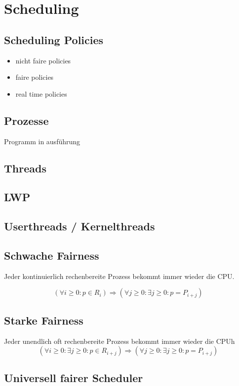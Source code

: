 \section{Scheduling}

\subsection{Scheduling Policies}

\begin{itemize}
\item nicht faire policies
\item faire policies
\item real time policies
\end{itemize}

\subsection{Prozesse}
Programm in ausführung

\subsection{Threads}

\subsection{LWP}

\subsection{Userthreads / Kernelthreads}

\subsection{Schwache Fairness}
Jeder kontinuierlich rechenbereite Prozess bekommt immer wieder die CPU.

$$(\forall i \geq 0 : p \in  R_{i}) \Rightarrow (\forall j \geq 0 : \exists j \geq 0 : p = P_{i+j})$$

\subsection{Starke Fairness}

Jeder unendlich oft rechenbereite Prozess bekommt immer wieder die CPUh
$$(\forall i \geq 0 : \exists j \geq 0 : p \in  R_{i + j}) \Rightarrow (\forall j \geq 0 : \exists j \geq 0 : p = P_{i+j})$$


\subsection{Universell fairer Scheduler}

